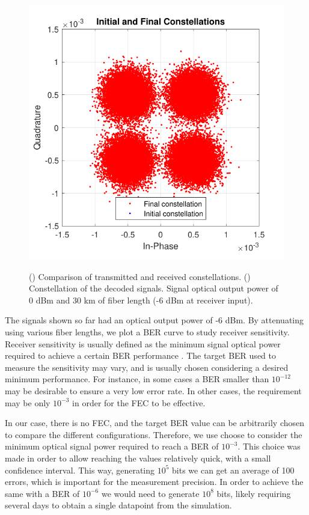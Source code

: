 \begin{figure}[H]
\begin{minipage}{0.45\textwidth}
	\includegraphics[width=1\textwidth]
	{sdf/m_qam_system/figures/simulations/02_thermal/constFinal.pdf}
	\subcaption{}\label{fig:thermalConstsSingle}
	\end{minipage}
	\caption{() Comparison of transmitted and 
		received constellations. () Constellation 
		of 
		the decoded 
		signals.  Signal optical output power of 0 dBm and 30 km of 
		fiber length (-6 dBm at receiver input).}\label{fig:thermalConsts}
\end{figure}

The signals shown so far had an optical output power of -6 dBm. By 
attenuating using various fiber lengths, we plot a BER curve to study
receiver sensitivity. Receiver sensitivity is usually defined as the minimum 
signal optical power required to achieve a certain BER performance 
\cite{hui09}. The target BER used to measure the sensitivity may vary, and is 
usually chosen considering a desired minimum performance. For instance, in some 
cases a BER smaller than $10^{-12}$ may be desirable to ensure a very low error 
rate. In other cases, the requirement may be only $10^{-3}$ in order for the 
FEC to be effective.

In our case, there is no FEC, and the target BER value can 
be arbitrarily chosen to compare the different configurations. Therefore, we 
use choose to consider the minimum optical signal power required to reach a BER 
of $10^{-3}$. This choice was made in order to allow reaching the values 
relatively quick, with a small confidence interval. This way, generating $10^5$ 
bits we can get an average of 100 errors, which is important for the 
measurement precision. In order to achieve the same with a BER of 
$10^{-6}$ we would need to generate $10^8$ bits, likely requiring several days 
to obtain a single datapoint from the simulation.


